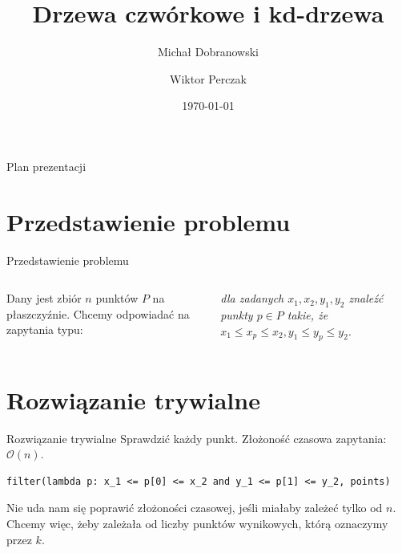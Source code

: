 \documentclass[aspectratio=169,dvipsnames]{beamer}
\title{Drzewa czwórkowe i kd-drzewa}
\date{\today}
\author{Michał Dobranowski \and Wiktor Perczak}
\newcommand{\sO}{\mathcal O}
\begin{document}
\maketitle

\begin{frame}{Plan prezentacji}
    \tableofcontents
\end{frame}

\section{Przedstawienie problemu}

\begin{frame}{Przedstawienie problemu}
    \begin{columns}

    Dany jest zbiór $n$ punktów $P$ na płaszczyźnie. Chcemy odpowiadać na zapytania typu:
    \begin{center}
        \textit{dla zadanych $x_1, x_2, y_1, y_2$ znaleźć punkty $p \in P$ takie, że $x_1 \leq x_p \leq x_2, y_1 \leq y_p \leq y_2$}.
    \end{center}

    \centering

    \end{columns}
\end{frame}

\section*{Rozwiązanie trywialne}

\begin{frame}[fragile]{Rozwiązanie trywialne}
    Sprawdzić każdy punkt. Złożoność czasowa zapytania: $\sO(n)$.

    \pause
    \hspace*{\fill}
    \begin{verbatim}
filter(lambda p: x_1 <= p[0] <= x_2 and y_1 <= p[1] <= y_2, points)
    \end{verbatim}
    \hspace*{\fill}

    \pause Nie uda nam się poprawić złożoności czasowej, jeśli miałaby zależeć tylko od $n$. Chcemy więc, żeby zależała od liczby punktów wynikowych, którą oznaczymy przez $k$.
\end{frame}
\end{document}
